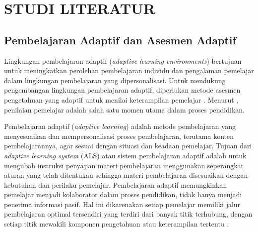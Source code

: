 \cleardoublepage %
\chapter{STUDI LITERATUR}
\label{chap:studi-literatur}


\section{Pembelajaran Adaptif dan Asesmen Adaptif}
\label{sec:adaptive_learning_assessment}
Lingkungan pembelajaran adaptif (\textit{adaptive learning environments}) bertujuan
untuk meningkatkan perolehan pembelajaran individu dan pengalaman pemelajar dalam
lingkungan pembelajaran yang dipersonalisasi. Untuk mendukung pengembangan lingkungan
pembelajaran adaptif, diperlukan metode asesmen pengetahuan yang
adaptif untuk menilai keterampilan pemelajar \autocite{Minn2022}. Menurut \textcite{Ihichr2024}, 
penilaian pemelajar adalah salah satu momen utama dalam proses pendidikan.

Pembelajaran adaptif (\textit{adaptive learning}) adalah metode pembelajaran
yang menyesuaikan dan mempersonalisasi proses pembelajaran, terutama konten pembelajarannya, agar sesuai dengan situasi dan keadaan pemelajar. Tujuan dari
\textit{adaptive learning system} (ALS) atau sistem pembelajaran adaptif
adalah untuk mengubah instruksi penyajian materi pembelajaran menggunakan seperangkat aturan yang telah
ditentukan sehingga materi pembelajaran disesuaikan dengan
kebutuhan dan perilaku pemelajar. Pembelajaran adaptif memungkinkan
pemelajar menjadi kolaborator dalam proses pendidikan, tidak hanya menjadi penerima informasi pasif. Hal ini dikarenakan setiap pemelajar memiliki jalur pembelajaran optimal tersendiri yang terdiri dari banyak titik terhubung, dengan setiap titik mewakili komponen pengetahuan atau keterampilan tertentu \autocite{Ihichr2024}.

